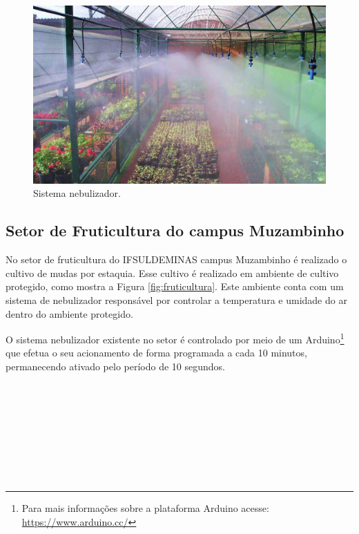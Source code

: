 \begin{figure}[H]
    \centering
    \includegraphics[scale=0.55]{04-figuras/nebulizacion_1.jpg}
    \caption{Sistema nebulizador.}
    \vspace{-\baselineskip}
    \label{fig:nebulizador}
\end{figure}


\subsection{Setor de Fruticultura do campus Muzambinho}
No setor de fruticultura do IFSULDEMINAS campus Muzambinho é realizado o cultivo de mudas por estaquia. Esse cultivo é realizado em ambiente de cultivo protegido, como mostra a Figura \ref{fig:fruticultura}. Este ambiente conta com um sistema de nebulizador responsável por controlar a temperatura e umidade do ar dentro do ambiente protegido.

O sistema nebulizador existente no setor é controlado por meio de um Arduino\footnote[1]{Para mais informações sobre a plataforma Arduino acesse: \url{https://www.arduino.cc/}} que efetua o seu acionamento de forma programada a cada 10 minutos, permanecendo ativado pelo período de 10 segundos.
\\
\\
\\
\\
\\
\\
\\
\\
\\

